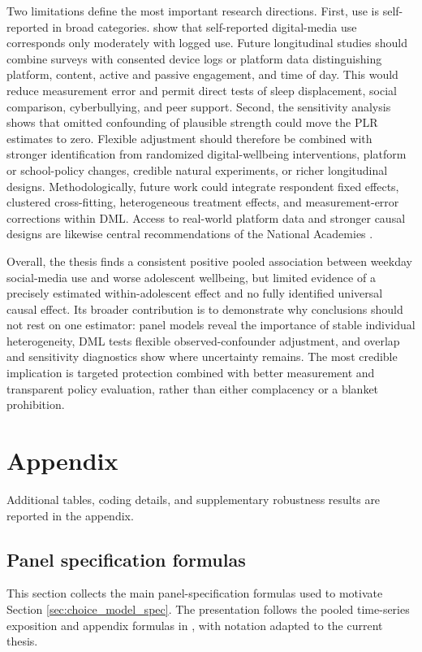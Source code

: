 \documentclass[11pt,oneside,a4paper]{book}
\newcommand{\bodychapter}[1]{%
  \chapter{#1}%
}
\newcommand{\tocsection}[2]{%
  \section[#1]{#2}%
}
\begin{document}
Two limitations define the most important research directions. First, use is self-reported in broad categories. \citet{parry2021discrepancies} show that self-reported digital-media use corresponds only moderately with logged use. Future longitudinal studies should combine surveys with consented device logs or platform data distinguishing platform, content, active and passive engagement, and time of day. This would reduce measurement error and permit direct tests of sleep displacement, social comparison, cyberbullying, and peer support. Second, the sensitivity analysis shows that omitted confounding of plausible strength could move the PLR estimates to zero. Flexible adjustment should therefore be combined with stronger identification from randomized digital-wellbeing interventions, platform or school-policy changes, credible natural experiments, or richer longitudinal designs. Methodologically, future work could integrate respondent fixed effects, clustered cross-fitting, heterogeneous treatment effects, and measurement-error corrections within DML. Access to real-world platform data and stronger causal designs are likewise central recommendations of the National Academies \citep{nasem2024socialmedia}.

Overall, the thesis finds a consistent positive pooled association between weekday social-media use and worse adolescent wellbeing, but limited evidence of a precisely estimated within-adolescent effect and no fully identified universal causal effect. Its broader contribution is to demonstrate why conclusions should not rest on one estimator: panel models reveal the importance of stable individual heterogeneity, DML tests flexible observed-confounder adjustment, and overlap and sensitivity diagnostics show where uncertainty remains. The most credible implication is targeted protection combined with better measurement and transparent policy evaluation, rather than either complacency or a blanket prohibition.

\appendix

\bodychapter{Appendix}

Additional tables, coding details, and supplementary robustness results are reported in the appendix.

\tocsection{Panel Specification Formulas}{Panel specification formulas}
\label{app:spec_tests}
This section collects the main panel-specification formulas used to motivate Section \ref{sec:choice_model_spec}. The presentation follows the pooled time-series exposition and appendix formulas in \citet{ward1993pooled}, with notation adapted to the current thesis.
\end{document}

